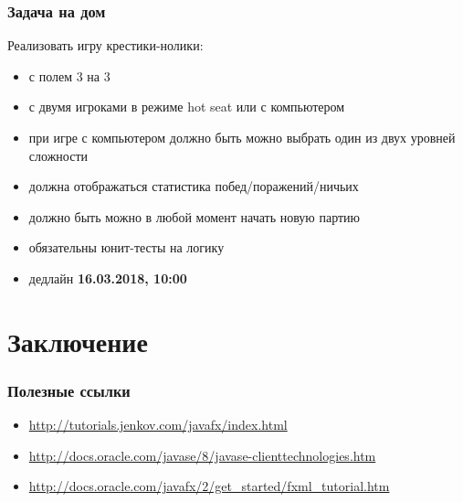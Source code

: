 \documentclass[xetex,mathserif,serif]{beamer}
\begin{document}
	\begin{frame}
		\frametitle{Задача на дом}
		Реализовать игру крестики-нолики:
		\begin{itemize}
			\item с полем 3 на 3
			\item с двумя игроками в режиме hot seat или с компьютером 
			\item при игре с компьютером должно быть можно выбрать один из двух уровней сложности
			\item должна отображаться статистика побед/поражений/ничьих
			\item должно быть можно в любой момент начать новую партию
			\item обязательны юнит-тесты на логику
			\item дедлайн \textbf{16.03.2018, 10:00}
		\end{itemize}
	\end{frame}

	\section{Заключение}

	\begin{frame}
		\frametitle{Полезные ссылки}
		\begin{itemize}
			\item \url{http://tutorials.jenkov.com/javafx/index.html}
			\item \url{http://docs.oracle.com/javase/8/javase-clienttechnologies.htm}
			\item \url{http://docs.oracle.com/javafx/2/get_started/fxml_tutorial.htm}
		\end{itemize}
	\end{frame}
\end{document}
